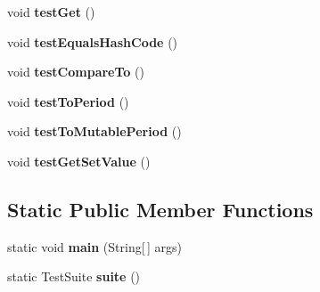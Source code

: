 \begin{DoxyCompactItemize}
\item 
\hypertarget{classorg_1_1joda_1_1time_1_1_test_base_single_field_period_a376d5bc6536b22eb281fc0165baca8ce}{void {\bfseries test\-Get} ()}\label{classorg_1_1joda_1_1time_1_1_test_base_single_field_period_a376d5bc6536b22eb281fc0165baca8ce}

\item 
\hypertarget{classorg_1_1joda_1_1time_1_1_test_base_single_field_period_a0f114d804fedb9e20bd777d9c057fc0c}{void {\bfseries test\-Equals\-Hash\-Code} ()}\label{classorg_1_1joda_1_1time_1_1_test_base_single_field_period_a0f114d804fedb9e20bd777d9c057fc0c}

\item 
\hypertarget{classorg_1_1joda_1_1time_1_1_test_base_single_field_period_a575db0c448aaa55957021b4f5bd64433}{void {\bfseries test\-Compare\-To} ()}\label{classorg_1_1joda_1_1time_1_1_test_base_single_field_period_a575db0c448aaa55957021b4f5bd64433}

\item 
\hypertarget{classorg_1_1joda_1_1time_1_1_test_base_single_field_period_a438d0bd8a76db92f96e317d981ee1ef7}{void {\bfseries test\-To\-Period} ()}\label{classorg_1_1joda_1_1time_1_1_test_base_single_field_period_a438d0bd8a76db92f96e317d981ee1ef7}

\item 
\hypertarget{classorg_1_1joda_1_1time_1_1_test_base_single_field_period_aa124b5601dfdae180b89cae8057003e2}{void {\bfseries test\-To\-Mutable\-Period} ()}\label{classorg_1_1joda_1_1time_1_1_test_base_single_field_period_aa124b5601dfdae180b89cae8057003e2}

\item 
\hypertarget{classorg_1_1joda_1_1time_1_1_test_base_single_field_period_a4fcdd1ac0743cf0d037a9a4c9feb2440}{void {\bfseries test\-Get\-Set\-Value} ()}\label{classorg_1_1joda_1_1time_1_1_test_base_single_field_period_a4fcdd1ac0743cf0d037a9a4c9feb2440}

\end{DoxyCompactItemize}
\subsection*{Static Public Member Functions}
\begin{DoxyCompactItemize}
\item 
\hypertarget{classorg_1_1joda_1_1time_1_1_test_base_single_field_period_a9a5d61a1769ff956a424d46388438a64}{static void {\bfseries main} (String\mbox{[}$\,$\mbox{]} args)}\label{classorg_1_1joda_1_1time_1_1_test_base_single_field_period_a9a5d61a1769ff956a424d46388438a64}

\item 
\hypertarget{classorg_1_1joda_1_1time_1_1_test_base_single_field_period_a5e4750d4ef0f3b424fa99647fa73e1f3}{static Test\-Suite {\bfseries suite} ()}\label{classorg_1_1joda_1_1time_1_1_test_base_single_field_period_a5e4750d4ef0f3b424fa99647fa73e1f3}

\end{DoxyCompactItemize}
